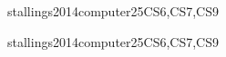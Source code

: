 \begin{syllabus}
\begin{unit}{\IASThreatsandAttacks}{}{stallings2014computer}{25}{CS6,CS7,CS9}
\begin{topics}%
    \item \IASThreatsandAttacksTopicAttacker
    \item \IASThreatsandAttacksTopicExamples
    \item \IASThreatsandAttacksTopicDenial
    \item \IASThreatsandAttacksTopicSocial
    \item \IASThreatsandAttacksTopicAttacks
    \item \IASThreatsandAttacksTopicMalware
\end{topics}
\begin{learningoutcomes}
    \item \IASThreatsandAttacksLODescribeLikely [\Familiarity]
    \item \IASThreatsandAttacksLODiscussTheMalware [\Familiarity]
    \item \IASThreatsandAttacksLOIdentifyInstances [\Familiarity]
    \item \IASThreatsandAttacksLODiscussHowService [\Familiarity]
    \item \IASThreatsandAttacksLODescribeRisks [\Familiarity]
    \item \IASThreatsandAttacksLODiscussTheCovert [\Familiarity]
\end{learningoutcomes}
\end{unit}

\begin{unit}{\IASNetworkSecurity}{}{stallings2014computer}{25}{CS6,CS7,CS9}
\begin{topics}%
    \item \IASNetworkSecurityTopicNetwork
    \item \IASNetworkSecurityTopicUse
    \item \IASNetworkSecurityTopicArchitectures
    \item \IASNetworkSecurityTopicDefense
    \item \IASNetworkSecurityTopicSecurity
    \item \IASNetworkSecurityTopicOther
    \item \IASNetworkSecurityTopicCensorship
    \item \IASNetworkSecurityTopicOperational
\end{topics}
\begin{learningoutcomes}
    \item \IASNetworkSecurityLODescribeTheOfAnd [\Familiarity]
    \item \IASNetworkSecurityLODescribeThePublic [\Familiarity]
    \item \IASNetworkSecurityLODescribeVirtues [\Familiarity]
    \item \IASNetworkSecurityLOIdentifyTheMechanism [\Usage]
\end{learningoutcomes}
\end{unit}


\end{syllabus}
